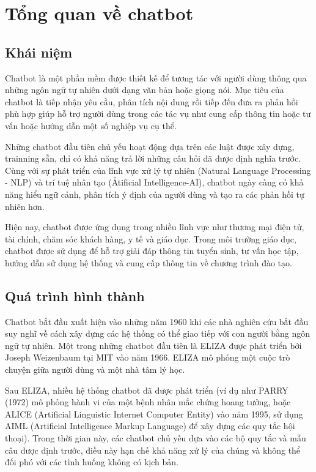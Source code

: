 \documentclass[../DoAn.tex]{subfiles}
\begin{document}
\section{Tổng quan về chatbot}
\subsection{Khái niệm}
Chatbot là một phần mềm được thiết kế để tương tác với người dùng thông qua những ngôn ngữ tự nhiên dưới dạng văn bản hoặc giọng nói. Mục tiêu của chatbot là tiếp nhận yêu cầu, phân tích nội dung rồi tiếp đến đưa ra phản hồi phù hợp giúp hỗ trợ người dùng trong các tác vụ như cung cấp thông tin hoặc tư vấn hoặc hướng dẫn một số nghiệp vụ cụ thể.

Những chatbot đầu tiên chủ yếu hoạt động dựa trên các luật được xây dựng, trainning sẵn, chỉ có khả năng trả lời những câu hỏi đã được định nghĩa trước. Cùng với sự phát triển của lĩnh vực xử lý tự nhiên (Natural Language Processing - NLP) và trí tuệ nhân tạo (Ảtificial Intelligence-AI), chatbot ngày càng có khả năng hiểu ngữ cảnh, phân tích ý định của người dùng và tạo ra các phản hồi tự nhiên hơn.

Hiện nay, chatbot được ứng dụng trong nhiều lĩnh vực như thương mại điện tử, tài chính, chăm sóc khách hàng, y tế và giáo dục. Trong môi trường giáo dục, chatbot được sử dụng để hỗ trợ giải đáp thông tin tuyển sinh, tư vấn học tập, hướng dẫn sử dụng hệ thống và cung cấp thông tin về chương trình đào tạo.

\subsection{Quá trình hình thành}
Chatbot bắt đầu xuất hiện vào những năm 1960 khi các nhà nghiên cứu bắt đầu suy nghĩ về cách xây dựng các hệ thống có thể giao tiếp với con người bằng ngôn ngữ tự nhiên. Một trong những chatbot đầu tiên là ELIZA được phát triển bởi Joseph Weizenbaum tại MIT vào năm 1966. ELIZA mô phỏng một cuộc trò chuyện giữa người dùng và một nhà tâm lý học.

Sau ELIZA, nhiều hệ thống chatbot đã được phát triển (ví dụ như PARRY (1972) mô phỏng hành vi của một bệnh nhân mắc chứng hoang tưởng, hoặc ALICE (Artificial Linguistic Internet Computer Entity) vào năm 1995, sử dụng AIML (Artificial Intelligence Markup Language) để xây dựng các quy tắc hội thoại). Trong thời gian này, các chatbot chủ yếu dựa vào các bộ quy tắc và mẫu câu được định trước, điều này hạn chế khả năng xử lý của chúng và không thể đối phó với các tình huống không có kịch bản.
\end{document}
